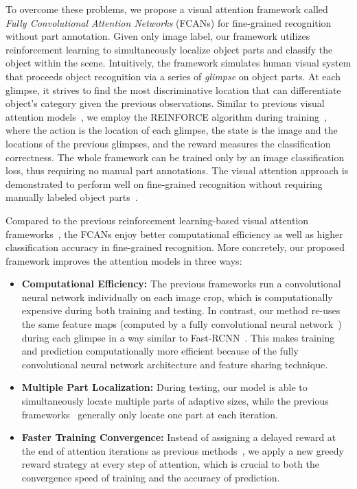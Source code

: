\documentclass[10pt,twocolumn,letterpaper]{article}
\begin{document}
To overcome these problems, we propose a visual attention framework called {\em Fully Convolutional Attention Networks} (FCANs) for fine-grained recognition without part annotation.
Given only image label, our framework utilizes reinforcement learning to simultaneously localize object parts and classify the object within the scene.
Intuitively, the framework simulates human visual system that proceeds object recognition via a series of {\em glimpse} on object parts.
At each glimpse, it strives to find the most discriminative location that can differentiate object's category given the previous observations.
Similar to previous visual attention models~\cite{mnih2014recurrent, sermanet2014attention}, we employ the REINFORCE algorithm during training~\cite{williams1992simple}, where the action is the location of each glimpse, the state is the image and the locations of the previous glimpses, and the reward measures the classification correctness.
The whole framework can be trained only by an image classification loss, thus requiring no manual part annotations.
The visual attention approach is demonstrated to perform well on fine-grained recognition without requiring manually labeled object parts~\cite{sermanet2014attention}.

Compared to the previous reinforcement learning-based visual attention frameworks~\cite{mnih2014recurrent, sermanet2014attention}, the FCANs enjoy better computational efficiency as well as higher classification accuracy in fine-grained recognition.
More concretely, our proposed framework improves the attention models in three ways:
\begin{itemize}
\item{\bf Computational Efficiency:} The previous frameworks run a convolutional neural network individually on each image crop, which is computationally expensive during both training and testing.
In contrast, our method re-uses the same feature maps (computed by a fully convolutional neural network~\cite{szegedy2015going, simonyan2014very}) during each glimpse in a way similar to Fast-RCNN~\cite{girshick2015fast}.
This makes training and prediction computationally more efficient because of the fully convolutional neural network architecture and feature sharing technique.
\item{\bf Multiple Part Localization:} During testing, our model is able to simultaneously locate multiple parts of adaptive sizes, while the previous frameworks~\cite{mnih2014recurrent, sermanet2014attention} generally only locate one part at each iteration.
\item{\bf Faster Training Convergence:} Instead of assigning a delayed reward at the end of attention iterations as previous methods~\cite{mnih2014recurrent, sermanet2014attention}, we apply a new greedy reward strategy at every step of attention, which is crucial to both the convergence speed of training and the accuracy of prediction.
\end{itemize}
\end{document}
